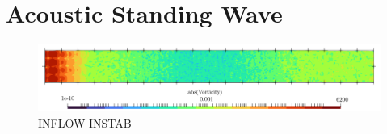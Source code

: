 \section{Acoustic Standing Wave}



\begin{figure}[t]
\centering
\includegraphics[scale=0.36]{assets/graphs/u-inflow-instab.png}
\caption{INFLOW INSTAB}
\label{fig:inflow-instab}
\end{figure}




